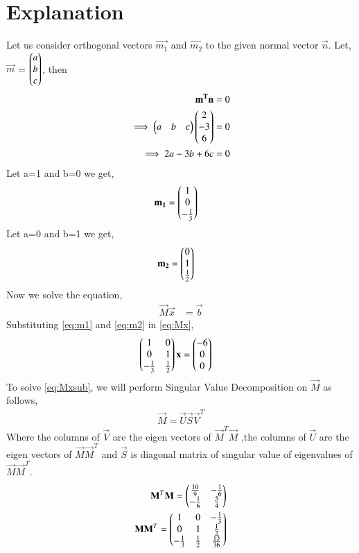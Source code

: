 \documentclass[journal,12pt,twocolumn]{IEEEtran}
\begin{document}
\section{Explanation}
Let us consider orthogonal vectors $\vec{m_1}$ and $\vec{m_2}$ to the given normal vector $\vec{n}$. Let, $\vec{m}$ = $\begin{pmatrix}a\\b\\c\end{pmatrix}$, then
\begin{align}
\mathbf{m^T}\mathbf{n} &= 0\\
\implies\begin{pmatrix}a&b&c\end{pmatrix}\begin{pmatrix}2\\-3\\6\end{pmatrix} &= 0\\
\implies2a-3b+6c &= 0
\end{align}
Let a=1 and b=0 we get,
\begin{align}
\mathbf{m_1} &= \begin{pmatrix}1\\0\\-\frac{1}{3}\end{pmatrix} \label{eq:m1}
\end{align}
Let a=0 and b=1 we get,
\begin{align}
\mathbf{m_2} &= \begin{pmatrix}0\\1\\\frac{1}{2}\end{pmatrix} \label{eq:m2}
\end{align}
Now we solve the equation,
\begin{align}
\vec{M}\vec{x} &= \vec{b}\label{eq:Mx}
\end{align}
Substituting \eqref{eq:m1} and \eqref{eq:m2} in \eqref{eq:Mx},
\begin{align}
    \begin{pmatrix}1&0\\0&1\\-\frac{1}{3}&\frac{1}{2}\end{pmatrix}\mathbf{x} &= \begin{pmatrix}-6\\0\\0\end{pmatrix}\label{eq:Mxsub}
\end{align}
To solve \eqref{eq:Mxsub}, we will perform Singular Value Decomposition on $\vec{M}$ as follows,
\begin{align}
\vec{M}=\vec{U}\vec{S}\vec{V}^T\label{eq:SVD}
\end{align}
Where the columns of $\vec{V}$ are the eigen vectors of $\vec{M}^T\vec{M}$ ,the columns of $\vec{U}$ are the eigen vectors of $\vec{M}\vec{M}^T$ and $\vec{S}$ is diagonal matrix of singular value of eigenvalues of $\vec{M}\vec{M}^T$.
\begin{align}
\mathbf{M}^T\mathbf{M}=\begin{pmatrix}\frac{10}{9}&-\frac{1}{6}\\-\frac{1}{6}&\frac{5}{4}\end{pmatrix}\label{eq:MtM}\\
\mathbf{M}\mathbf{M}^T=\begin{pmatrix}1&0&-\frac{1}{3}\\0&1&\frac{1}{2}\\-\frac{1}{3}&\frac{1}{2}&\frac{13}{36}\end{pmatrix}
\end{align}
\end{document}
